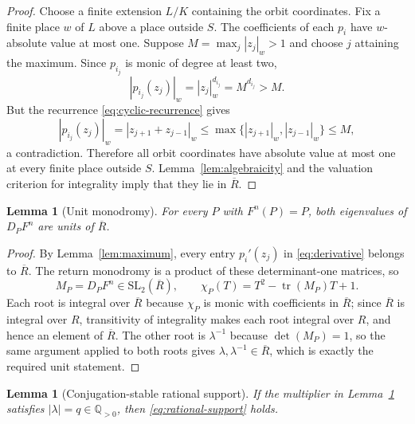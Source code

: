 \documentclass[11pt]{article}
\newtheorem{lemma}[theorem]{Lemma}
\theoremstyle{definition}
\theoremstyle{remark}
\newcommand{\Q}{\mathbb Q}
\newcommand{\Rbar}{\overline R}
\begin{document}
\begin{proof}
Choose a finite extension $L/K$ containing the orbit coordinates.  Fix a
finite place $w$ of $L$ above a place outside $S$.  The coefficients of each
$p_i$ have $w$-absolute value at most one.  Suppose
$M=\max_j|z_j|_w>1$ and choose $j$ attaining the maximum.  Since $p_{i_j}$ is
monic of degree at least two,
\begin{equation}
 |p_{i_j}(z_j)|_w=|z_j|_w^{d_{i_j}}=M^{d_{i_j}}>M.
 \label{eq:strict-maximum}
\end{equation}
But the recurrence \eqref{eq:cyclic-recurrence} gives
\[
 |p_{i_j}(z_j)|_w
 =|z_{j+1}+z_{j-1}|_w
 \le\max\{|z_{j+1}|_w,|z_{j-1}|_w\}\le M,
\]
a contradiction.  Therefore all orbit coordinates have absolute value at
most one at every finite place outside $S$.  Lemma~\ref{lem:algebraicity} and
the valuation criterion for integrality imply that they lie in $\Rbar$.
\end{proof}

\begin{lemma}[Unit monodromy]
\label{lem:monodromy}
For every $P$ with $F^n(P)=P$, both eigenvalues of $D_PF^n$ are units of
$\Rbar$.
\end{lemma}

\begin{proof}
By Lemma~\ref{lem:maximum}, every entry $p_i'(z_j)$ in
\eqref{eq:derivative} belongs to $\Rbar$.  The return monodromy is a product
of these determinant-one matrices, so
\[
 M_P=D_PF^n\in\mathrm{SL}_2(\Rbar),\qquad
 \chi_P(T)=T^2-\operatorname{tr}(M_P)T+1.
\]
Each root is integral over $\Rbar$ because $\chi_P$ is monic with coefficients
in $\Rbar$; since $\Rbar$ is integral over $R$, transitivity of integrality
makes each root integral over $R$, and hence an element of $\Rbar$.  The other
root is $\lambda^{-1}$ because $\det(M_P)=1$, so the same argument applied to
both roots gives $\lambda,\lambda^{-1}\in\Rbar$, which is exactly the required
unit statement.
\end{proof}

\begin{lemma}[Conjugation-stable rational support]
\label{lem:conjugation}
If the multiplier in Lemma~\ref{lem:monodromy} satisfies
$|\lambda|=q\in\Q_{>0}$, then \eqref{eq:rational-support} holds.
\end{lemma}
\end{document}
